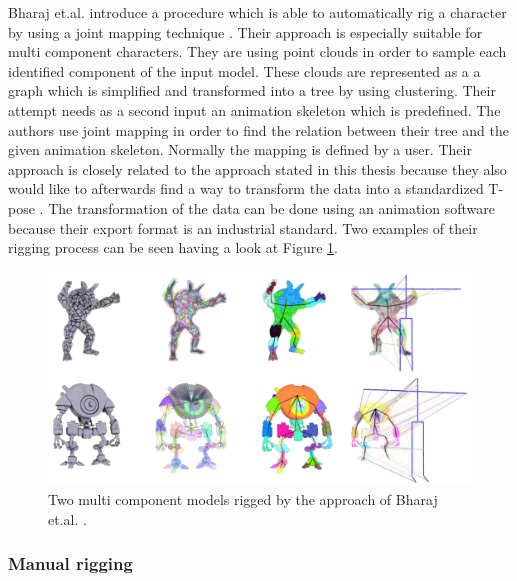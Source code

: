 Bharaj et.al. introduce a procedure which is able to automatically rig a character by using a joint mapping technique \cite{Bharaj2012}. Their approach is especially suitable for multi component characters. They are using point clouds in order to sample each identified component of the input model. These clouds are represented as a a graph which is simplified and transformed into a tree by using clustering. Their attempt needs as a second input an animation skeleton which is predefined. The authors use joint mapping in order to find the relation between their tree and the given animation skeleton. Normally the mapping is defined by a user. Their approach is closely related to the approach stated in this thesis because they also would like to afterwards find a way to transform the data into a standardized T-pose \cite{Bharaj2012}. The transformation of the data can be done using an animation software because their export format is an industrial standard. Two examples of their rigging process can be seen having a look at Figure \ref{fig:bharaj}.

\begin{figure} [htb!]
    \centering
	\includegraphics[width=15cm]{content/images/baharaj}
	\caption{Two multi component models rigged by the approach of Bharaj et.al.  \cite{Bharaj2012}.} 
	\label{fig:bharaj}
\end{figure}

\subsubsection{Manual rigging}

